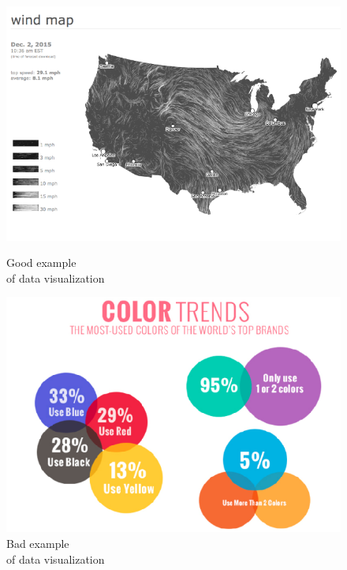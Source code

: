 \documentclass{article}
\begin{document}
\begin{figure}[H]
\centering
\begin{minipage}{.5\textwidth}
  \centering
  \includegraphics[width=0.97\linewidth]{img/goodvis.png}
  \caption[Good example of data visualization]
    {Good example \\ of data visualization\endtabular}
  \label{fig:goodchart}
\end{minipage}%
\begin{minipage}{.5\textwidth}
  \centering
  \includegraphics[width=0.97\linewidth]{img/badvis.png}
  \caption[Bad example of data visualization]
  {Bad example \\ of data visualization\endtabular}
  \label{fig:badchart}
\end{minipage}
\end{figure}
\end{document}
